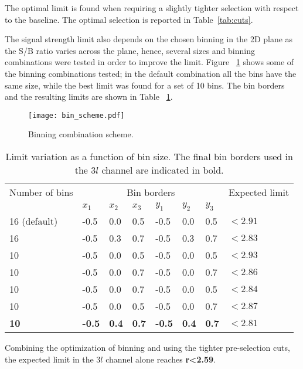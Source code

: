 The optimal limit is found when requiring a slightly tighter selection with respect to the baseline. The optimal selection is reported in Table~\ref{tab:cuts}.

The signal strength limit also depends on the chosen binning in the 2D plane as the S/B ratio varies across the plane, hence, several sizes and binning combinations were tested in order to improve the limit. Figure ~\ref{bins} shows some of the binning combinations tested; in the default combination all the bins have the same size, while the best limit was found for a set of 10 bins. The bin borders and the resulting limits are shown in Table ~\ref{bin_limits}.

\begin{figure} [!h]
 \centering
 \texttt{[image: bin\_scheme.pdf]} 
\caption{Binning combination scheme.}
\label{bins}
\end{figure}

\begin{table}[h!]
\centering
\begin{tabular}{llllllll}\hline
Number of bins  & \multicolumn{6}{c}{Bin borders}  & Expected limit \\%
                &$x_1$&$x_2$&$x_3$&$y_1$&$y_2$&$y_3$&\\\hline           
16 (default)    &-0.5 & 0.0 & 0.5 &-0.5 & 0.0 & 0.5 & $<2.91$\\
16              &-0.5 & 0.3 & 0.7 &-0.5 & 0.3 & 0.7 & $<2.83$\\
10              &-0.5 & 0.0 & 0.5 &-0.5 & 0.0 & 0.5 & $<2.93$\\
10              &-0.5 & 0.0 & 0.7 &-0.5 & 0.0 & 0.7 & $<2.86$\\
10              &-0.5 & 0.0 & 0.7 &-0.5 & 0.0 & 0.5 & $<2.84$\\
10              &-0.5 & 0.0 & 0.5 &-0.5 & 0.0 & 0.7 & $<2.87$\\
\textbf{10}     &\textbf{-0.5} &\textbf{0.4} &\textbf{0.7} &\textbf{-0.5} &\textbf{0.4} &\textbf{0.7} &$\mathbf{<2.81}$\\\hline
\end{tabular}
\caption[Limit variation as a function of bin size.]{Limit variation as a function of bin size. The final bin borders used in the $3l$ channel are indicated in bold.}
\label{bin_limits}
\end{table}

Combining the optimization of binning and using the tighter pre-selection cuts, the expected limit in the $3l$ channel alone reaches \textbf{r<2.59}.

